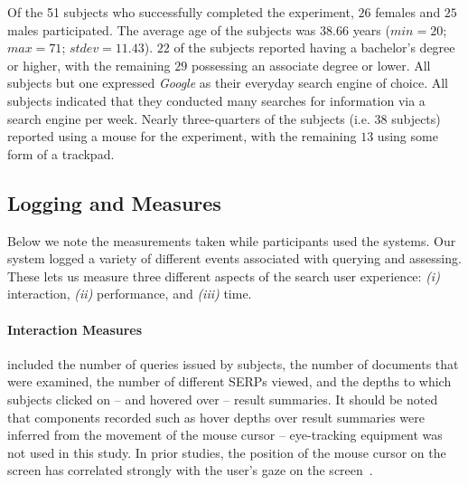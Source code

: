 Of the 51 subjects who successfully completed the experiment, $26$ females and $25$ males participated. The average age of the subjects was $38.66$ years ($min=20$; $max=71$; $stdev=11.43$). $22$ of the subjects reported having a bachelor's degree or higher, with the remaining $29$ possessing an associate degree or lower. All subjects but one expressed \emph{Google} as their everyday search engine of choice. All subjects indicated that they conducted many searches for information via a search engine per week. Nearly three-quarters of the subjects (i.e. 38 subjects) reported using a mouse for the experiment, with the remaining $13$ using some form of a trackpad.





\subsection{Logging and Measures}\label{sec:method:behaviours}
Below we note the measurements taken while participants used the systems.
Our system logged a variety of different events associated with querying and assessing. These lets us measure three different aspects of the search user experience: \emph{(i)} interaction, \emph{(ii)} performance, and \emph{(iii)} time. 

\paragraph{Interaction Measures} included the number of queries issued by subjects, the number of documents that were examined, the number of different SERPs viewed, and the depths to which subjects clicked on -- and hovered over -- result summaries. It should be noted that components recorded such as hover depths over result summaries were inferred from the movement of the mouse cursor -- eye-tracking equipment was not used in this study. In prior studies, the position of the mouse cursor on the screen has correlated strongly with the user's gaze on the screen~\cite{chen2001mouse_cursor,smucker2014judging_relevance_movements}.
\vspace*{2mm}

